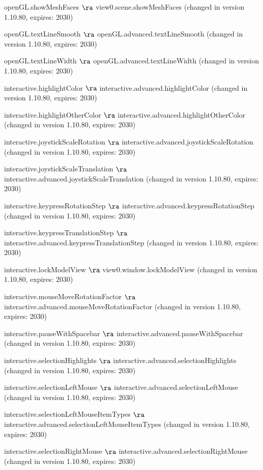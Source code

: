   \item openGL.showMeshFaces $\ra$ view0.scene.showMeshFaces (changed in version 1.10.80, expires: 2030)
  \item openGL.textLineSmooth $\ra$ openGL.advanced.textLineSmooth (changed in version 1.10.80, expires: 2030)
  \item openGL.textLineWidth $\ra$ openGL.advanced.textLineWidth (changed in version 1.10.80, expires: 2030)
  \item interactive.highlightColor $\ra$ interactive.advanced.highlightColor (changed in version 1.10.80, expires: 2030)
  \item interactive.highlightOtherColor $\ra$ interactive.advanced.highlightOtherColor (changed in version 1.10.80, expires: 2030)
  \item interactive.joystickScaleRotation $\ra$ interactive.advanced.joystickScaleRotation (changed in version 1.10.80, expires: 2030)
  \item interactive.joystickScaleTranslation $\ra$ interactive.advanced.joystickScaleTranslation (changed in version 1.10.80, expires: 2030)
  \item interactive.keypressRotationStep $\ra$ interactive.advanced.keypressRotationStep (changed in version 1.10.80, expires: 2030)
  \item interactive.keypressTranslationStep $\ra$ interactive.advanced.keypressTranslationStep (changed in version 1.10.80, expires: 2030)
  \item interactive.lockModelView $\ra$ view0.window.lockModelView (changed in version 1.10.80, expires: 2030)
  \item interactive.mouseMoveRotationFactor $\ra$ interactive.advanced.mouseMoveRotationFactor (changed in version 1.10.80, expires: 2030)
  \item interactive.pauseWithSpacebar $\ra$ interactive.advanced.pauseWithSpacebar (changed in version 1.10.80, expires: 2030)
  \item interactive.selectionHighlights $\ra$ interactive.advanced.selectionHighlights (changed in version 1.10.80, expires: 2030)
  \item interactive.selectionLeftMouse $\ra$ interactive.advanced.selectionLeftMouse (changed in version 1.10.80, expires: 2030)
  \item interactive.selectionLeftMouseItemTypes $\ra$ interactive.advanced.selectionLeftMouseItemTypes (changed in version 1.10.80, expires: 2030)
  \item interactive.selectionRightMouse $\ra$ interactive.advanced.selectionRightMouse (changed in version 1.10.80, expires: 2030)
